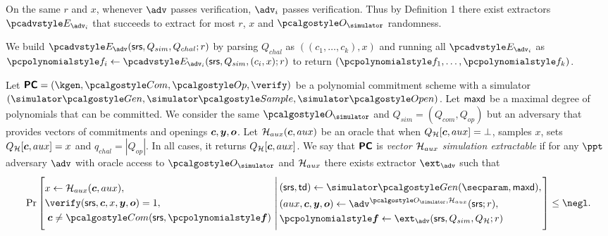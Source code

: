 \documentclass[runningheads,11pt]{llncs}
\let\spvec\vec
\let\vec\accentvec
\let\spvec\vec
\let\vec\spvec
\def\vec#1{\mathchoice{\mbox{\boldmath$\displaystyle#1$}}
  {\mbox{\boldmath$\textstyle#1$}} {\mbox{\boldmath$\scriptstyle#1$}}
  {\mbox{\boldmath$\scriptscriptstyle#1$}}}
\begin{document}
On the same $r$ and $x$, whenever $\adv$ passes verification, $\adv_{i}$ passes verification.  Thus by Definition 1 there exist extractors $\Ext_{\adv_{i}}$ that succeeds to extract for most $r$, $x$ and $\oracles$ randomness.

We build $\Ext_{\adv}(\srs, Q_{sim}, Q_{chal}; r)$ by parsing $Q_{chal}$ as $((c_{1},\dots, c_{k}), x)$ and running all $\Ext_{\adv_{i}}$ as $\p{f}_{i}\gets \Ext_{\adv_{i}}(\srs,Q_{sim},(c_{i},x); r)$ to return $(\p{f}_{1},\dots,\p{f}_{k})$.

\begin{definition}
  \label{def:sepcom}
  Let $\PCOM = (\kgen, \com, \open, \verify)$ be a polynomial commitment
  scheme with a simulator $(\simgen, \simsample, \simopen)$. Let $\mathsf{maxd}$ be a maximal degree of polynomials that can be
  committed. 
  We consider the same $\oracles$ and $Q_{sim}= (Q_{com},Q_{op})$ but an adversary that provides vectors of commitments and openings $\vec{c}, \vec{y}, \vec{o}$.
   Let $\ro_{aux}(\vec{c},aux)$ be an oracle that when $Q_{\ro}[\vec{c},aux] = \bot$, samples $x$, sets $Q_{\ro}[\vec{c},aux]=x$ and $q_{{chal}}= |Q_{{op}}|$. In all cases, it returns $Q_{\ro}[\vec{c},aux]$.
  We say that $\bm{\mathsf{PC}}$ is \emph{vector $\mathcal{H}_{aux}$ simulation extractable} if for any $\ppt$
  adversary $\adv$ with oracle access to $\oracles$ and $\mathcal{H}_{aux}$ there exists extractor
  $\ext_{\adv}$ such that
\[
  \Pr \left[
    \begin{aligned}
      & x \gets \ro_{aux}(\vec{c},aux), \\
      & \verify(\srs, \vec{c}, x, \vec{y}, \vec{o}) = 1, \\
      & \;\vec{c} \neq \com(\srs, \vec{\p{f}})\\
    \end{aligned}
    \,\left|\,
      \vphantom{
        \begin{aligned}
          & \\
          & \\
          & \\
          &
        \end{aligned}
        }
    \begin{aligned}
      & (\srs, \td) \gets \simgen(\secparam, \maxdeg),\\
      & (aux,\vec{c},\vec{y}, \vec{o}) \gets \adv^{\oracles,\ro_{aux}}(\srs; r), \\
      & \vec{\p{f}} \gets \ext_\adv(\srs, Q_{sim}, Q_{\ro}; r)
    \end{aligned}
  \right.\right]
  \leq \negl.
\]
\end{definition}
\end{document}
